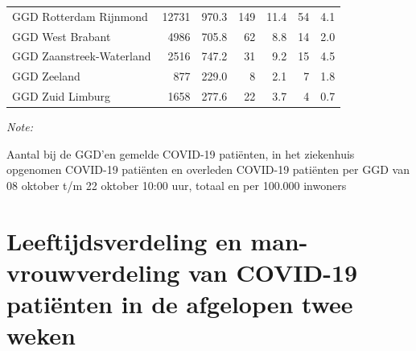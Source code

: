 \documentclass[
  english,
  man,floatsintext]{apa6}
\begin{document}
\begin{table}[H]
\begin{threeparttable}
\begin{tabular}{lrrrrrr}
GGD Rotterdam Rijnmond & 12731 & 970.3 & 149 & 11.4 & 54 & 4.1\\
GGD West Brabant & 4986 & 705.8 & 62 & 8.8 & 14 & 2.0\\
GGD Zaanstreek-Waterland & 2516 & 747.2 & 31 & 9.2 & 15 & 4.5\\
GGD Zeeland & 877 & 229.0 & 8 & 2.1 & 7 & 1.8\\
GGD Zuid Limburg & 1658 & 277.6 & 22 & 3.7 & 4 & 0.7\\
\bottomrule
\end{tabular}
\begin{tablenotes}
\item \textit{Note: } 
\item Aantal bij de GGD’en gemelde COVID-19 patiënten, in het ziekenhuis opgenomen COVID-19 patiënten en overleden COVID-19 patiënten per GGD van 08 oktober t/m 22 oktober 10:00 uur, totaal en per 100.000 inwoners
\end{tablenotes}
\end{threeparttable}
\endgroup{}
\end{table}

\newpage

\hypertarget{leeftijdsverdeling-en-man-vrouwverdeling-van-covid-19-patiuxebnten-in-de-afgelopen-twee-weken}{%
\section{Leeftijdsverdeling en man-vrouwverdeling van COVID-19 patiënten in de afgelopen twee weken}\label{leeftijdsverdeling-en-man-vrouwverdeling-van-covid-19-patiuxebnten-in-de-afgelopen-twee-weken}}
\end{document}
